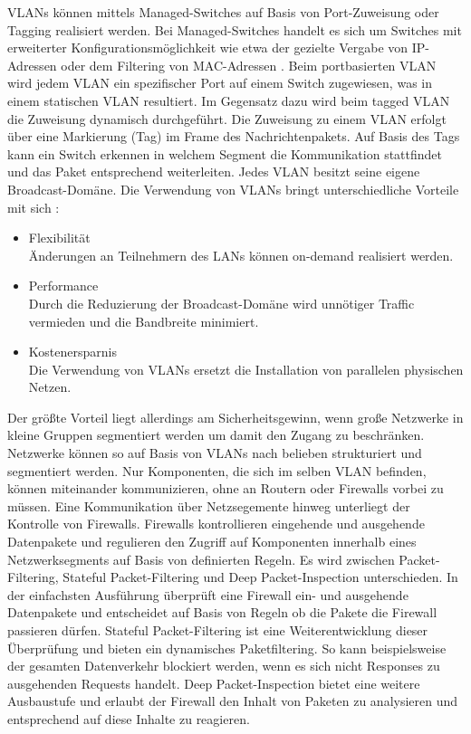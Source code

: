 VLANs können mittels \glqq{}Managed-Switches\grqq{} auf Basis von Port-Zuweisung oder \glqq{}Tagging\grqq{} realisiert werden. Bei Managed-Switches handelt es sich um Switches mit erweiterter Konfigurationsmöglichkeit wie etwa der gezielte Vergabe von IP-Adressen oder dem Filtering von MAC-Adressen \autocite{netgear}.
Beim portbasierten VLAN wird jedem VLAN ein spezifischer Port auf einem Switch zugewiesen, was in einem statischen VLAN resultiert. Im Gegensatz dazu wird beim tagged VLAN die Zuweisung dynamisch durchgeführt. Die Zuweisung zu einem VLAN erfolgt über eine Markierung (Tag) im Frame des Nachrichtenpakets. Auf Basis des Tags kann ein Switch erkennen in welchem Segment die Kommunikation stattfindet und das Paket entsprechend weiterleiten. Jedes VLAN besitzt seine eigene Broadcast-Domäne. \autocite{ionos_digitalguide}
\bigbreak
Die Verwendung von VLANs bringt unterschiedliche Vorteile mit sich \autocite{ionos_digitalguide}:
\begin{itemize}
    \item Flexibilität\\
    Änderungen an Teilnehmern des LANs können on-demand realisiert werden.
    \item Performance\\
    Durch die Reduzierung der Broadcast-Domäne wird unnötiger Traffic vermieden und die Bandbreite minimiert.
    \item Kostenersparnis\\
    Die Verwendung von VLANs ersetzt die Installation von parallelen physischen Netzen.
\end{itemize}
\bigbreak
Der größte Vorteil liegt allerdings am Sicherheitsgewinn, wenn große Netzwerke in kleine Gruppen segmentiert werden um damit den Zugang zu beschränken. Netzwerke können so auf Basis von VLANs nach belieben strukturiert und segmentiert werden. Nur Komponenten, die sich im selben VLAN befinden, können miteinander kommunizieren, ohne an Routern oder Firewalls vorbei zu müssen. Eine Kommunikation über Netzsegemente hinweg unterliegt der Kontrolle von Firewalls. \autocite{ionos_digitalguide}
\bigbreak
Firewalls kontrollieren eingehende und ausgehende Datenpakete und regulieren den Zugriff auf Komponenten innerhalb eines Netzwerksegments auf Basis von definierten Regeln. Es wird zwischen \glqq{}Packet-Filtering\grqq{}, \glqq{}Stateful Packet-Filtering\grqq{} und \glqq{}Deep Packet-Inspection\grqq{} unterschieden. In der einfachsten Ausführung überprüft eine Firewall ein- und ausgehende Datenpakete und entscheidet auf Basis von Regeln ob die Pakete die Firewall passieren dürfen. Stateful Packet-Filtering ist eine Weiterentwicklung dieser Überprüfung und bieten ein dynamisches Paketfiltering. So kann beispielsweise der gesamten Datenverkehr blockiert werden, wenn es sich nicht Responses zu ausgehenden Requests handelt. Deep Packet-Inspection bietet eine weitere Ausbaustufe und erlaubt der Firewall den Inhalt von Paketen zu analysieren und entsprechend auf diese Inhalte zu reagieren. \autocite{SheikhAhmedF2020CSCS}
